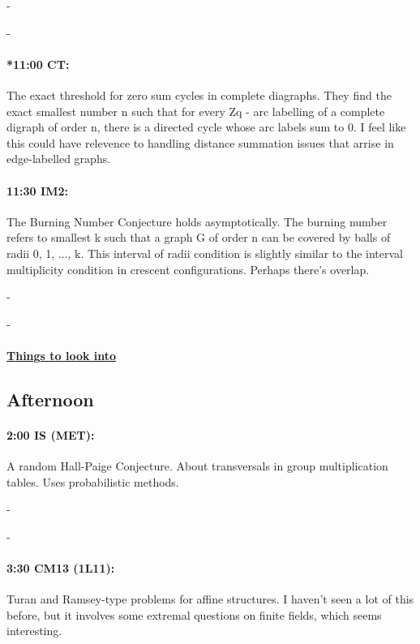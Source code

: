 \documentclass[12]{article}
\theoremstyle{definition}
\begin{document}
	-
	
	-
	
	\paragraph{*11:00 CT:} The exact threshold for zero sum cycles in complete diagraphs.
	They find the exact smallest number n such that for every Zq - arc labelling of a complete digraph of order n, there is a directed cycle whose arc labels sum to 0.  I feel like this could have relevence to handling distance summation issues that arrise in edge-labelled graphs.
	
	\paragraph{11:30 IM2:} The Burning Number Conjecture holds asymptotically.
	The burning number refers to smallest k such that a graph G of order n can be covered by balls of radii 0, 1, ..., k.  This interval of radii condition is slightly similar to the interval multiplicity condition in crescent configurations.  Perhaps there's overlap.
	
	-
	
	-
	
	\begin{center} 
		\item\paragraph{\underline{Things to look into}} 
	\end{center}

	
	\newpage
	\subsection{Afternoon}
	
	\paragraph{2:00 IS (MET):} A random Hall-Paige Conjecture.
	About transversals in group multiplication tables.  Uses probabilistic methods.
	
	-
	
	-
	
	\paragraph{3:30 CM13 (1L11):} Turan and Ramsey-type problems for affine structures.
	I haven't seen a lot of this before, but it involves some extremal questions on finite fields, which seems interesting.
	
\end{document}
